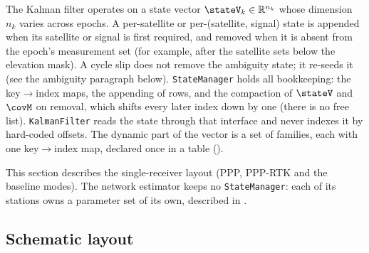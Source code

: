 
The Kalman filter operates on a state vector $\stateV_k \in \mathbb{R}^{n_k}$
whose dimension $n_k$ varies across epochs.  A per-satellite or
per-(satellite, signal) state is appended when its satellite or signal is
first required, and removed when it is absent from the epoch's measurement
set (for example, after the satellite sets below the elevation mask).  A
cycle slip does not remove the ambiguity state; it re-seeds it (see the
ambiguity paragraph below).  \texttt{StateManager} holds all bookkeeping:
the key$\to$index maps, the appending of rows, and the compaction of
$\stateV$ and $\covM$ on removal, which shifts every later index down by
one (there is no free list).  \texttt{KalmanFilter} reads the state
through that interface and never indexes it by hard-coded offsets.  The
dynamic part of the vector is a set of families, each with one key$\to$index
map, declared once in a table ().

This section describes the single-receiver layout (PPP, PPP-RTK and the
baseline modes).  The network estimator keeps no \texttt{StateManager}: each
of its stations owns a parameter set of its own, described in
.

\subsection{Schematic layout}

